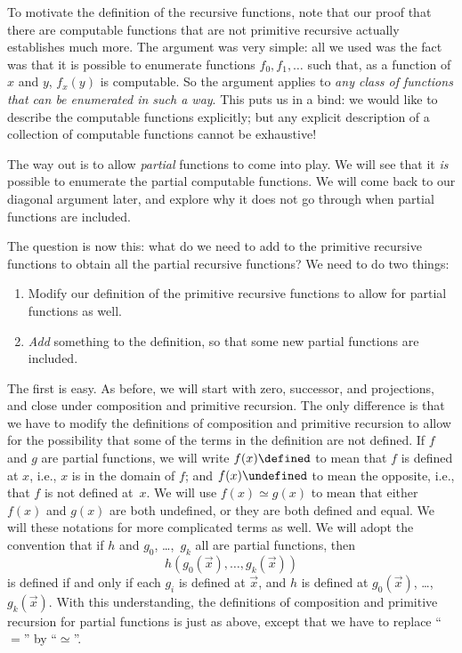 \documentclass[../../include/open-logic-section]{subfiles}
\begin{document}


To motivate the definition of the recursive functions, note that our
proof that there are computable functions that are not primitive
recursive actually establishes much more. The argument was very
simple: all we used was the fact was that it is possible to enumerate
functions $f_0,f_1,\dots$ such that, as a function of $x$ and $y$,
$f_x(y)$ is computable. So the argument applies to \emph{any class of
  functions that can be enumerated in such a way}. This puts us in a
bind: we would like to describe the computable functions explicitly;
but any explicit description of a collection of computable functions
cannot be exhaustive!

The way out is to allow \emph{partial} functions to come into play. We
will see that it \emph{is} possible to enumerate the partial
computable functions. We will come back to our diagonal
argument later, and explore why it does not go through when partial
functions are included.

The question is now this: what do we need to add to the primitive
recursive functions to obtain all the partial recursive functions? We
need to do two things:
\begin{enumerate}
\item Modify our definition of the primitive recursive functions to
  allow for partial functions as well.
\item \emph{Add} something to the definition, so that some new partial
  functions are included.
\end{enumerate}

The first is easy. As before, we will start with zero, successor, and
projections, and close under composition and primitive recursion. The
only difference is that we have to modify the definitions of
composition and primitive recursion to allow for the possibility that
some of the terms in the definition are not defined. If $f$ and $g$
are partial functions, we will write $f(x) \defined$ to mean that $f$
is defined at $x$, i.e., $x$ is in the domain of $f$; and $f(x)
\undefined$ to mean the opposite, i.e., that $f$ is not defined at~$x$.
We will use $f(x) \simeq g(x)$ to mean that either $f(x)$ and $g(x)$
are both undefined, or they are both defined and equal. We will these
notations for more complicated terms as well. We will adopt the
convention that if $h$ and $g_0$, \dots,~$g_k$ all are partial functions,
then
\[
h(g_0(\vec x),\dots,g_k(\vec x))
\]
is defined if and only if each $g_i$ is defined at $\vec x$, and $h$
is defined at $g_0(\vec x)$, \dots,~$g_k(\vec x)$. With this
understanding, the definitions of composition and primitive recursion
for partial functions is just as above, except that we have to replace
``$=$'' by ``$\simeq$''.
\end{document}
